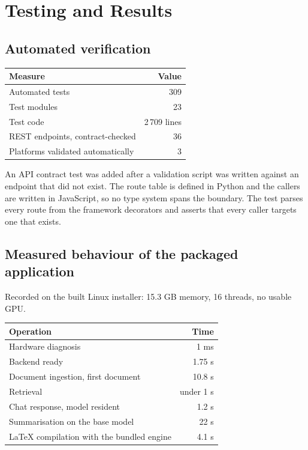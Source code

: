 \documentclass[11pt,a4paper]{article}
\begin{document}
\section{Testing and Results}

\subsection{Automated verification}

\begin{center}
\small
\begin{tabular}{@{}lr@{}}
\toprule
\textbf{Measure} & \textbf{Value} \\
\midrule
Automated tests & 309 \\
Test modules & 23 \\
Test code & 2\,709 lines \\
REST endpoints, contract-checked & 36 \\
Platforms validated automatically & 3 \\
\bottomrule
\end{tabular}
\end{center}

An API contract test was added after a validation script was written against an
endpoint that did not exist. The route table is defined in Python and the
callers are written in JavaScript, so no type system spans the boundary. The
test parses every route from the framework decorators and asserts that every
caller targets one that exists.

\subsection{Measured behaviour of the packaged application}

Recorded on the built Linux installer: 15.3 GB memory, 16 threads, no usable
GPU.

\begin{center}
\small
\begin{tabular}{@{}lr@{}}
\toprule
\textbf{Operation} & \textbf{Time} \\
\midrule
Hardware diagnosis & 1 ms \\
Backend ready & 1.75 s \\
Document ingestion, first document & 10.8 s \\
Retrieval & under 1 s \\
Chat response, model resident & 1.2 s \\
Summarisation on the base model & 22 s \\
LaTeX compilation with the bundled engine & 4.1 s \\
\bottomrule
\end{tabular}
\end{center}
\end{document}
